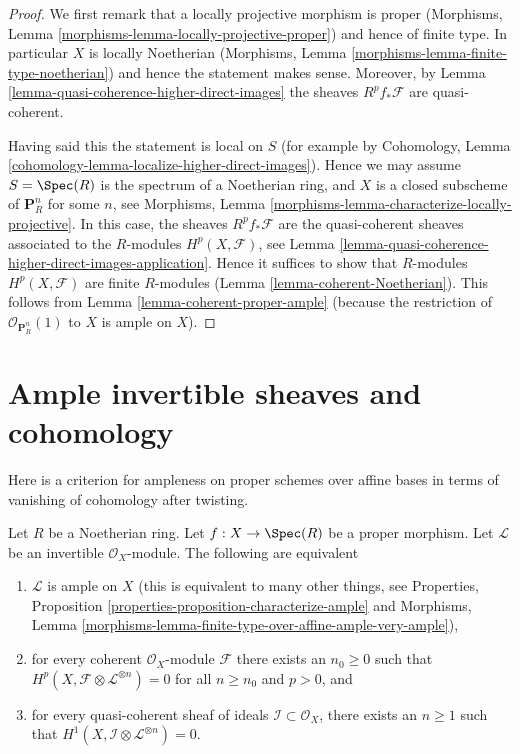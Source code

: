 \begin{proof}
We first remark that a locally projective morphism is proper
(Morphisms, Lemma \ref{morphisms-lemma-locally-projective-proper})
and hence of finite type.
In particular $X$ is locally Noetherian
(Morphisms, Lemma \ref{morphisms-lemma-finite-type-noetherian})
and hence the statement makes sense.
Moreover, by Lemma \ref{lemma-quasi-coherence-higher-direct-images}
the sheaves $R^pf_*\mathcal{F}$ are quasi-coherent.

\medskip\noindent
Having said this the statement is local on $S$ (for example by
Cohomology, Lemma \ref{cohomology-lemma-localize-higher-direct-images}).
Hence we may assume $S = \Spec(R)$ is the spectrum of
a Noetherian ring, and $X$ is a closed subscheme of
$\mathbf{P}^n_R$ for some $n$, see
Morphisms, Lemma \ref{morphisms-lemma-characterize-locally-projective}.
In this case, the sheaves $R^pf_*\mathcal{F}$ are the quasi-coherent
sheaves associated to the $R$-modules $H^p(X, \mathcal{F})$, see
Lemma \ref{lemma-quasi-coherence-higher-direct-images-application}.
Hence it suffices to show that $R$-modules $H^p(X, \mathcal{F})$
are finite $R$-modules (Lemma \ref{lemma-coherent-Noetherian}).
This follows from Lemma \ref{lemma-coherent-proper-ample}
(because the restriction of $\mathcal{O}_{\mathbf{P}^n_R}(1)$
to $X$ is ample on $X$).
\end{proof}








\section{Ample invertible sheaves and cohomology}
\label{section-ample-cohomology}

\noindent
Here is a criterion for ampleness on proper schemes over affine bases
in terms of vanishing of cohomology after twisting.

\begin{lemma}
\label{lemma-vanshing-gives-ample}
Let $R$ be a Noetherian ring. Let $f : X \to \Spec(R)$ be a proper morphism.
Let $\mathcal{L}$ be an invertible $\mathcal{O}_X$-module.
The following are equivalent
\begin{enumerate}
\item $\mathcal{L}$ is ample on $X$ (this is equivalent to many other
things, see
Properties, Proposition \ref{properties-proposition-characterize-ample} and
Morphisms, Lemma
\ref{morphisms-lemma-finite-type-over-affine-ample-very-ample}),
\item for every coherent $\mathcal{O}_X$-module $\mathcal{F}$ there exists
an $n_0 \geq 0$ such that
$H^p(X, \mathcal{F} \otimes \mathcal{L}^{\otimes n}) = 0$ for all $n \geq n_0$
and $p > 0$, and
\item for every quasi-coherent sheaf of ideals
$\mathcal{I} \subset \mathcal{O}_X$, there exists an $n \geq 1$
such that $H^1(X, \mathcal{I} \otimes \mathcal{L}^{\otimes n}) = 0$.
\end{enumerate}
\end{lemma}

